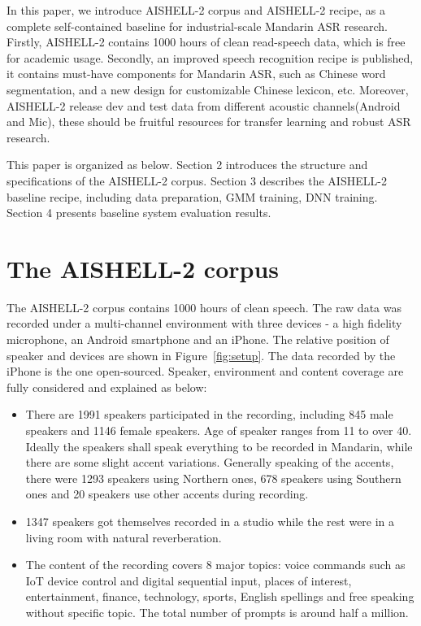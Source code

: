 \documentclass[a4paper]{article}
\begin{document}
In this paper, we introduce AISHELL-2 corpus and AISHELL-2 recipe, as a complete 
self-contained baseline for industrial-scale Mandarin ASR research. 
Firstly, AISHELL-2 contains 1000 hours of clean read-speech data, which is free 
for academic usage. Secondly, an improved speech recognition
recipe is published, it contains must-have components for Mandarin ASR,
such as Chinese word segmentation, and a new design for customizable Chinese
lexicon, etc. Moreover, AISHELL-2 release dev and test data from different acoustic channels(Android and Mic),
these should be fruitful resources for transfer learning and robust ASR research.

This paper is organized as below. Section 2 introduces the structure and
specifications of the AISHELL-2 corpus. Section 3 describes the AISHELL-2
baseline recipe, including data preparation, GMM training, DNN training.
Section 4 presents baseline system evaluation results.

\section{The AISHELL-2 corpus}

The AISHELL-2 corpus contains 1000 hours of clean speech. The raw data was recorded under a multi-channel environment with three devices - a high fidelity microphone, an Android smartphone and an iPhone. The relative position of speaker and devices are shown in Figure~\ref{fig:setup}. The data recorded by the iPhone is the one open-sourced. Speaker, environment and content coverage are fully considered and explained as below:
\begin{itemize}
\item There are 1991 speakers participated in the recording, including 845 male speakers and 1146 female speakers. Age of speaker ranges from 11 to over 40. Ideally the speakers shall speak everything to be recorded in Mandarin, while there are some slight accent variations. Generally speaking of the accents, there were 1293 speakers using Northern ones, 678 speakers using Southern ones and 20 speakers use other accents during recording. 
\item 1347 speakers got themselves recorded in a studio while the rest were in a living room with natural reverberation.
\item The content of the recording covers 8 major topics: voice commands such as IoT device control and digital sequential input, places of interest, entertainment, finance, technology, sports, English spellings and free speaking without specific topic. The total number of prompts is around half a million.
\end{itemize}
\end{document}
